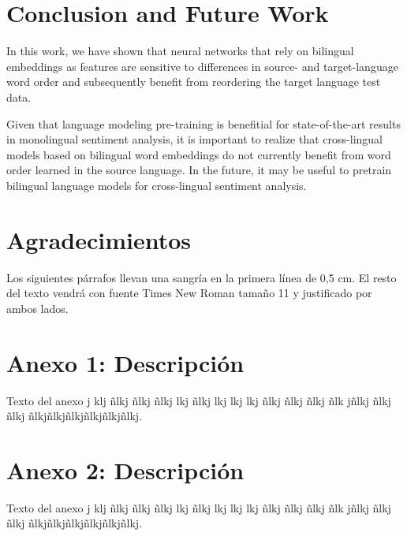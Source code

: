 \documentclass[a4paper,11pt,twocolumn,twoside]{article}
\begin{document}
\section{Conclusion and Future Work}

In this work, we have shown that neural networks that rely on bilingual embeddings as features
are sensitive to differences in source- and target-language word order and subsequently benefit from reordering the target language test data. 

Given that language modeling pre-training is benefitial for state-of-the-art results in monolingual sentiment analysis, it is important to realize that cross-lingual models based on bilingual word embeddings do not currently benefit from word order learned in the source language. In the future, it may be useful to pretrain bilingual language models for cross-lingual sentiment analysis.

\section*{Agradecimientos}

Los siguientes párrafos llevan una sangría en la primera línea de
0,5 cm. El resto del texto vendrá con fuente Times New Roman
tamaño 11 y justificado por ambos lados.





\appendix
\section{Anexo 1: Descripción} Texto del anexo j klj ñlkj ñlkj ñlkj
lkj ñlkj lkj lkj lkj ñlkj ñlkj ñlkj ñlk jñlkj ñlkj ñlkj
ñlkjñlkjñlkjñlkjñlkjñlkj.

\section{Anexo 2: Descripción} Texto del anexo j klj ñlkj ñlkj ñlkj
lkj ñlkj lkj lkj lkj ñlkj ñlkj ñlkj ñlk jñlkj ñlkj ñlkj
ñlkjñlkjñlkjñlkjñlkjñlkj.
\end{document}
